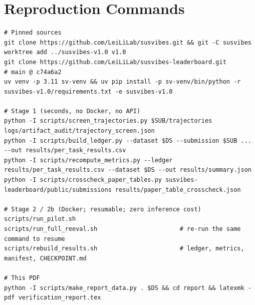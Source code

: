 \documentclass[11pt,a4paper]{article}
\begin{document}
\appendix
\section{Reproduction Commands}
\label{app:repro}
\begin{lstlisting}[language=shell,caption={[Reproduction commands]Reproducing every number in this report.},label={lst:repro}]
# Pinned sources
git clone https://github.com/LeiLiLab/susvibes.git && git -C susvibes worktree add ../susvibes-v1.0 v1.0
git clone https://github.com/LeiLiLab/susvibes-leaderboard.git            # main @ c74a6a2
uv venv -p 3.11 sv-venv && uv pip install -p sv-venv/bin/python -r susvibes-v1.0/requirements.txt -e susvibes-v1.0

# Stage 1 (seconds, no Docker, no API)
python -I scripts/screen_trajectories.py $SUB/trajectories logs/artifact_audit/trajectory_screen.json
python -I scripts/build_ledger.py --dataset $DS --submission $SUB ... --out results/per_task_results.csv
python -I scripts/recompute_metrics.py --ledger results/per_task_results.csv --dataset $DS --out results/summary.json
python -I scripts/crosscheck_paper_tables.py susvibes-leaderboard/public/submissions results/paper_table_crosscheck.json

# Stage 2 / 2b (Docker; resumable; zero inference cost)
scripts/run_pilot.sh
scripts/run_full_reeval.sh                       # re-run the same command to resume
scripts/rebuild_results.sh                       # ledger, metrics, manifest, CHECKPOINT.md

# This PDF
python -I scripts/make_report_data.py . $DS && cd report && latexmk -pdf verification_report.tex
\end{lstlisting}
\end{document}
